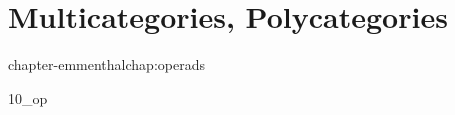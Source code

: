 
\chapter{Multicategories, Polycategories}{chapter-emmenthal}{chap:operads}
\label{chap:operads}

{10_op}

